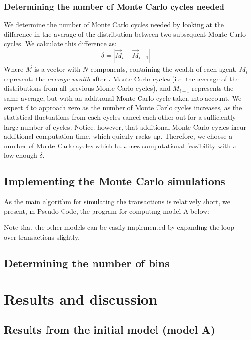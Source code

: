 \documentclass[a4paper, 10pt]{article}
\begin{document}
\subsubsection{Determining the number of Monte Carlo cycles needed}
We determine the number of Monte Carlo cycles needed by looking at the difference in the average of the distribution between two subsequent Monte Carlo cycles. We calculate this difference as:
\begin{equation}\label{eq:Relative_diff_MC_steps}
\delta = |\vec{M}_{i}-\vec{M}_{i-1}|
\end{equation}
Where $\vec{M}$ is a vector with $N$ components, containing the wealth of each agent. $M_i$ represents the \textit{average wealth} after $i$ Monte Carlo cycles (i.e. the average of the distributions from all previous Monte Carlo cycles), and $M_{i+1}$ represents the same average, but with an additional Monte Carlo cycle taken into account. We expect $\delta$ to approach zero as the number of Monte Carlo cycles increases, as the statistical fluctuations from each cycles cancel each other out for a sufficiently large number of cycles. Notice, however, that additional Monte Carlo cycles incur additional computation time, which quickly racks up. Therefore, we choose a number of Monte Carlo cycles which balances computational feasibility with a low enough $\delta$. 
\subsection{Implementing the Monte Carlo simulations}
As the main algorithm for simulating the transactions is relatively short, we present, in Pseudo-Code, the program for computing model A below:

Note that the other models can be easily implemented by expanding the loop over transactions slightly.
\subsection{Determining the number of bins}
\section{Results and discussion}
\subsection{Results from the initial model (model A)}
\end{document}
